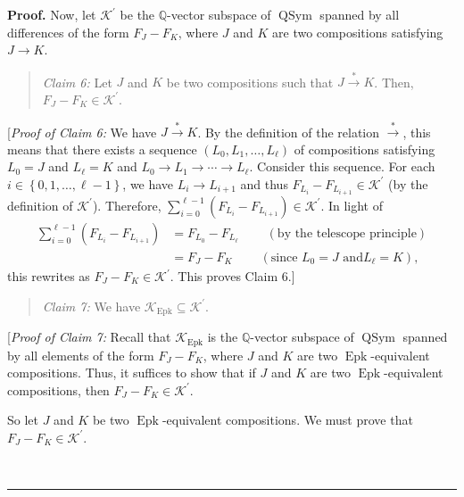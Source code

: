 \documentclass[numbers=enddot,12pt,final,onecolumn,notitlepage]{scrartcl}%
\theoremstyle{definition}
\newenvironment{statement}{\begin{quote}}{\end{quote}}
\newenvironment{proof}[1][Proof]{\noindent\textbf{#1.} }{\ \rule{0.5em}{0.5em}}
\newenvironment{verlong}{}{}
\let\sumnonlimits\sum
\renewcommand{\sum}{\sumnonlimits\limits}
\begin{document}
\begin{verlong}
\begin{proof}
Now, let $\mathcal{K}^{\prime}$ be the $\mathbb{Q}$-vector subspace of
$\operatorname*{QSym}$ spanned by all differences of the form $F_{J}-F_{K}$,
where $J$ and $K$ are two compositions satisfying $J\rightarrow K$.

\begin{statement}
\textit{Claim 6:} Let $J$ and $K$ be two compositions such that
$J\overset{\ast}{\rightarrow}K$. Then, $F_{J}-F_{K}\in\mathcal{K}^{\prime}$.
\end{statement}

[\textit{Proof of Claim 6:} We have $J\overset{\ast}{\rightarrow}K$. By the
definition of the relation $\overset{\ast}{\rightarrow}$, this means that
there exists a sequence $\left(  L_{0},L_{1},\ldots,L_{\ell}\right)  $ of
compositions satisfying $L_{0}=J$ and $L_{\ell}=K$ and $L_{0}\rightarrow
L_{1}\rightarrow\cdots\rightarrow L_{\ell}$. Consider this sequence. For each
$i\in\left\{  0,1,\ldots,\ell-1\right\}  $, we have $L_{i}\rightarrow L_{i+1}$
and thus $F_{L_{i}}-F_{L_{i+1}}\in\mathcal{K}^{\prime}$ (by the definition of
$\mathcal{K}^{\prime}$). Therefore, $\sum_{i=0}^{\ell-1}\left(  F_{L_{i}%
}-F_{L_{i+1}}\right)  \in\mathcal{K}^{\prime}$. In light of%
\begin{align*}
\sum_{i=0}^{\ell-1}\left(  F_{L_{i}}-F_{L_{i+1}}\right)   &  =F_{L_{0}%
}-F_{L_{\ell}}\ \ \ \ \ \ \ \ \ \ \left(  \text{by the telescope
principle}\right) \\
&  =F_{J}-F_{K}\ \ \ \ \ \ \ \ \ \ \left(  \text{since }L_{0}=J\text{ and
}L_{\ell}=K\right)  ,
\end{align*}
this rewrites as $F_{J}-F_{K}\in\mathcal{K}^{\prime}$. This proves Claim 6.]

\begin{statement}
\textit{Claim 7:} We have $\mathcal{K}_{\operatorname*{Epk}}\subseteq
\mathcal{K}^{\prime}$.
\end{statement}

[\textit{Proof of Claim 7:} Recall that $\mathcal{K}_{\operatorname*{Epk}}$ is
the $\mathbb{Q}$-vector subspace of $\operatorname*{QSym}$ spanned by all
elements of the form $F_{J}-F_{K}$, where $J$ and $K$ are two
$\operatorname*{Epk}$-equivalent compositions. Thus, it suffices to show that
if $J$ and $K$ are two $\operatorname*{Epk}$-equivalent compositions, then
$F_{J}-F_{K}\in\mathcal{K}^{\prime}$.

So let $J$ and $K$ be two $\operatorname*{Epk}$-equivalent compositions. We
must prove that $F_{J}-F_{K}\in\mathcal{K}^{\prime}$.


\end{proof}
\end{verlong}
\end{document}
